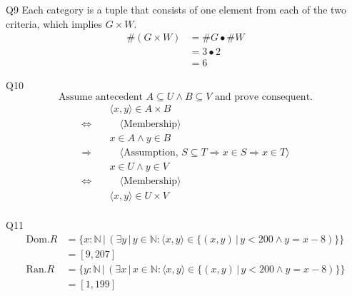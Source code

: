\documentclass{article}
\begin{document}
    \vspace{10mm}
    Q9
    Each category is a tuple that consists of one element from each of the two criteria, which implies $G \times W$.
    \begin{align*}
        \#(G \times W) &= \#G \bullet \#W \\
        &= 3 \bullet 2 \\
        &= 6
    \end{align*}

    \newpage
    Q10
    \begin{equation*}
        \text{Assume antecedent } A\subseteq U \land B\subseteq V \text{ and prove consequent.}
    \end{equation*}
    \begin{align*}
        & \quad \langle x,y\rangle\in A\times B \\
        \Longleftrightarrow & \qquad \langle \text{Membership} \rangle \\
        & \quad x\in A\land y\in B \\
        \Longrightarrow & \qquad \langle \text{Assumption, } S\subseteq T \Longrightarrow x\in S \Longrightarrow x\in T \rangle \\
        & \quad x\in U\land y\in V \\
        \Longleftrightarrow & \qquad \langle \text{Membership} \rangle \\
        & \quad \langle x,y\rangle\in U\times V \\
    \end{align*}

    \vspace{10mm}
    Q11
    \begin{align*}
        \text{Dom.}R &= \{x:\mathbb{N}\, |\, (\exists y\, |\, y \in \mathbb{N}: \langle x, y \rangle \in \{(x, y)\, |\, y < 200 \land y = x - 8)\} \} \\
        &= [9, 207] \\
        \text{Ran.}R &= \{y:\mathbb{N}\, |\, (\exists x\, |\, x \in \mathbb{N}: \langle x, y \rangle \in \{(x, y)\, |\, y < 200 \land y = x - 8)\} \} \\
        &= [1, 199] \\
    \end{align*}
\end{document}
